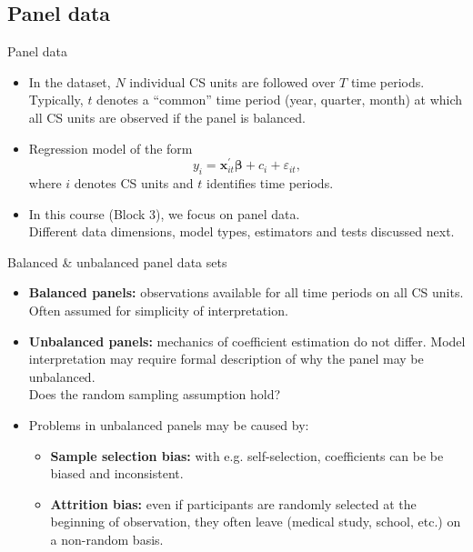 \documentclass[usenames,dvipsnames]{beamer}
\begin{document}
\subsection*{Panel data}
\begin{frame}{Panel data}
\begin{itemize}
\item In the dataset, $N$ individual CS units are followed over $T$ time periods. Typically, $t$ denotes a ``common'' time period (year, quarter, month) at which all CS units are observed if the panel is balanced.
\medskip
\item Regression model of the form $$y_i = \bm{x}_{it}^{\prime}\bm{\beta} + c_i + \varepsilon_{it},$$ where $i$ denotes CS units and $t$ identifies time periods.
\medskip
\item In this course (Block 3), we focus on panel data.\\ \medskip Different data dimensions, model types, estimators and tests discussed next.
\end{itemize}
\end{frame}
\begin{frame}{Balanced \& unbalanced panel data sets}
\begin{itemize}
\bigskip
\item \textbf{Balanced panels:} observations available for all time periods on all CS units. Often assumed for simplicity of interpretation.
\bigskip
\item \textbf{Unbalanced panels:} mechanics of coefficient estimation do not differ. Model interpretation may require formal description of why the panel may be unbalanced.\\Does the random sampling assumption hold? 
\bigskip
\item Problems in unbalanced panels may be caused by: 
\medskip
\begin{itemize}
    \item \textbf{Sample selection bias:} with e.g. self-selection, coefficients can be be biased and inconsistent.
    \medskip
    \item \textbf{Attrition bias:} even if participants are randomly selected  at the beginning of observation, they often leave (medical study, school, etc.) on a non-random basis.   
\end{itemize}
\end{itemize}
\end{frame}
\end{document}
